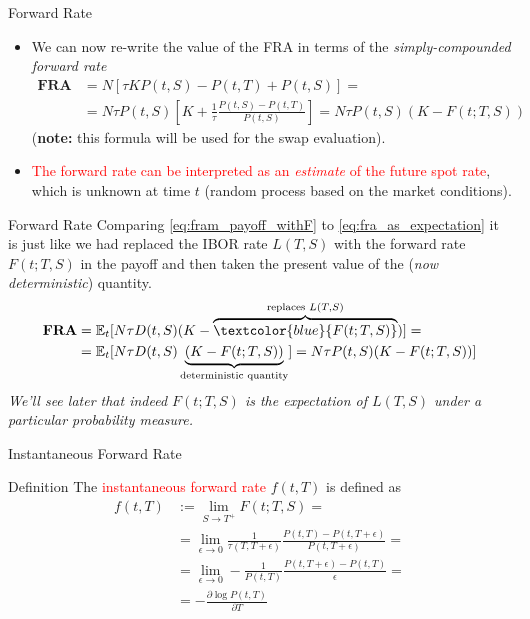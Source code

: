 \documentclass{beamer}
\begin{document}
\begin{frame}{Forward Rate}
	\begin{itemize}
		\item We can now re-write the value of the FRA in terms of the \emph{simply-compounded forward rate}
		\begin{equation}
			\begin{aligned}
			\textbf{FRA}&=N[\tau KP(t,S)-P(t,T)+P(t,S)] = \\
			&=N\tau P(t,S) \left[K +\frac{1}{\tau} \frac{P(t,S)-P(t,T)}{P(t,S)}\right] = N\tau P(t,S)(K-F(t;T,S))
			\end{aligned}
			\label{eq:fram_payoff_withF}
		\end{equation}
		(\textbf{note:} this formula will be used for the swap evaluation).
		\item<2-> \textcolor{red}{The forward rate can be interpreted as an \emph{estimate} of the future spot rate}, which is unknown at time $t$ (random process based on the market conditions).
	\end{itemize}
\end{frame}

\begin{frame}{Forward Rate}
	Comparing \cref{eq:fram_payoff_withF} to \cref{eq:fra_as_expectation} it is just like we had replaced the IBOR rate $L(T,S)$ with the forward rate $F(t;T,S)$ in the payoff and then taken the present value of the (\emph{now deterministic}) quantity.
	\begin{equation*}
		\begin{aligned}
			\textbf{FRA} &= \mathbb{E}_t[N\tau D(t,S)(K-\overbrace{\textcolor{blue}{F(t; T, S)}}^{\text{replaces } L(T, S)})] = \\
			& = \mathbb{E}_t[N\tau D(t,S)\underbrace{(K-F(t; T, S))}_{\text{deterministic quantity}}] = N\tau P(t,S)(K-F(t; T, S))]
		\end{aligned}
	\end{equation*}
	\emph{We'll see later that indeed $F(t;T,S)$ is the expectation of $L(T,S)$ under a particular probability measure.}
\end{frame}

\begin{frame}{Instantaneous Forward Rate}
	\begin{block}{Definition}
	The \textcolor{red}{instantaneous forward rate} $f(t, T)$ is defined as 
	\begin{equation}
		\begin{aligned}
			f(t, T) &:= \lim_{S\rightarrow T^+} F(t;T,S) =\\
			& = \lim_{\epsilon\rightarrow 0}  \frac{1}{\tau(T,T+\epsilon)}\frac{P(t,T)-P(t,T+\epsilon)}{P(t,T+\epsilon)} = \\
			& = \lim_{\epsilon\rightarrow 0} - \frac{1}{P(t,T)} \frac{P(t,T+\epsilon)-P(t,T)}{\epsilon} =\\
			& = -\frac{\partial \log P(t, T)}{\partial T}
		\end{aligned}
	\end{equation}
\myendproof
	\end{block}
\end{frame}
\end{document}
